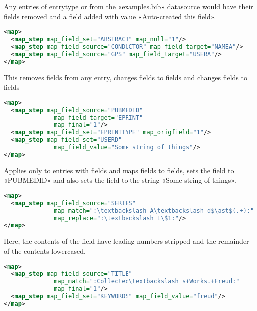 \documentclass{ltxdockit}
\begin{document}
\noindent Any entries of entrytype  or  from the
«examples.bib» datasource would have their 
fields removed and a  field added with value «Auto-created this field».

\begin{lstlisting}[language=xml,escapechar=:,mathescape=true]
<map>
  <map_step map_field_set="ABSTRACT" map_null="1"/>
  <map_step map_field_source="CONDUCTOR" map_field_target="NAMEA"/>
  <map_step map_field_source="GPS" map_field_target="USERA"/>
</map>
\end{lstlisting}

\noindent This removes  fields from any entry, changes
 fields to  fields and changes 
fields to  fields

\begin{lstlisting}[language=xml,escapechar=:,mathescape=true]
<map>
  <map_step map_field_source="PUBMEDID"
              map_field_target="EPRINT"
              map_final="1"/>
  <map_step map_field_set="EPRINTTYPE" map_origfield="1"/>
  <map_step map_field_set="USERD"
              map_field_value="Some string of things"/>
</map>
\end{lstlisting}

\noindent Applies only to entries with  fields and maps
 fields to  fields, sets the 
field to «PUBMEDID» and also sets the  field to the string
«Some string of things».

\begin{lstlisting}[language=xml,escapechar=:,mathescape=true]
<map>
  <map_step map_field_source="SERIES"
              map_match=":\textbackslash A\textbackslash d$\ast$(.+):"
              map_replace=":\textbackslash L\$1:"/>
</map>
\end{lstlisting}

\noindent Here, the contents of the 
field have leading numbers stripped and the remainder of the contents
lowercased.

\begin{lstlisting}[language=xml,escapechar=:,mathescape=true]
<map>
  <map_step map_field_source="TITLE"
              map_match=":Collected\textbackslash s+Works.+Freud:"
              map_final="1"/>
  <map_step map_field_set="KEYWORDS" map_field_value="freud"/>
</map>
\end{lstlisting}
\end{document}
